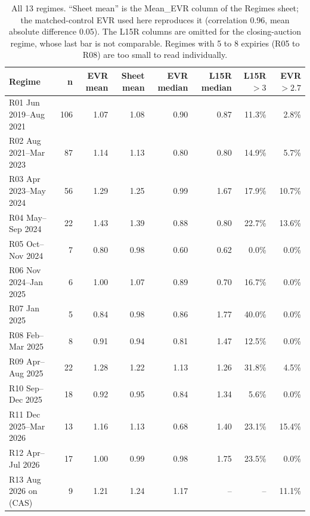 \begin{table}[h!]\centering\small
\begin{tabular}{lrrrrrrr}
\toprule
Regime & n & EVR mean & Sheet mean & EVR median & L15R median & L15R $>3$ & EVR $>2.7$\\
\midrule
R01 Jun 2019--Aug 2021 & 106 & 1.07 & 1.08 & 0.90 & 0.87 & 11.3\% & 2.8\%\\
R02 Aug 2021--Mar 2023 & 87 & 1.14 & 1.13 & 0.80 & 0.80 & 14.9\% & 5.7\%\\
R03 Apr 2023--May 2024 & 56 & 1.29 & 1.25 & 0.99 & 1.67 & 17.9\% & 10.7\%\\
R04 May--Sep 2024 & 22 & 1.43 & 1.39 & 0.88 & 0.80 & 22.7\% & 13.6\%\\
R05 Oct--Nov 2024 & 7 & 0.80 & 0.98 & 0.60 & 0.62 & 0.0\% & 0.0\%\\
R06 Nov 2024--Jan 2025 & 6 & 1.00 & 1.07 & 0.89 & 0.70 & 16.7\% & 0.0\%\\
R07 Jan 2025 & 5 & 0.84 & 0.98 & 0.86 & 1.77 & 40.0\% & 0.0\%\\
R08 Feb--Mar 2025 & 8 & 0.91 & 0.94 & 0.81 & 1.47 & 12.5\% & 0.0\%\\
R09 Apr--Aug 2025 & 22 & 1.28 & 1.22 & 1.13 & 1.26 & 31.8\% & 4.5\%\\
R10 Sep--Dec 2025 & 18 & 0.92 & 0.95 & 0.84 & 1.34 & 5.6\% & 0.0\%\\
R11 Dec 2025--Mar 2026 & 13 & 1.16 & 1.13 & 0.68 & 1.40 & 23.1\% & 15.4\%\\
R12 Apr--Jul 2026 & 17 & 1.00 & 0.99 & 0.98 & 1.75 & 23.5\% & 0.0\%\\
R13 Aug 2026 on (CAS) & 9 & 1.21 & 1.24 & 1.17 & -- & -- & 11.1\%\\
\bottomrule
\end{tabular}
\caption{All 13 regimes. ``Sheet mean'' is the Mean\_EVR column of the Regimes sheet; the matched-control EVR used here reproduces it (correlation 0.96, mean absolute difference 0.05). The L15R columns are omitted for the closing-auction regime, whose last bar is not comparable. Regimes with 5 to 8 expiries (R05 to R08) are too small to read individually.}
\end{table}
